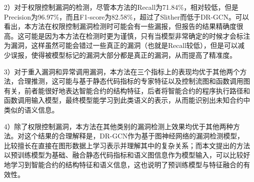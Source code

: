 2）对于权限控制漏洞的检测，尽管本方法的Recall为71.84\%，相对较低，但是Precision为96.97\%，而且F1-score为82.58\%，超过了Slither而低于DR-GCN。可以看出，本方法在权限控制漏洞检测时可能会有一些漏报，但报告的结果精确度很高。这可能是因为本方法在检测时更为谨慎，只有当模型非常确定的时候才会标注为漏洞，这样虽然可能会错过一些真正的漏洞（也就是Recall较低），但是可以减少误报，使得被模型标记的漏洞大部分都是真正的漏洞，从而提高了精准度。

3）对于重入漏洞和异常调用漏洞，本方法在三个指标上的表现均优于其他两个方法，合理推测，这可能与基于静态代码指标的专家特征以及控制流图和函数调用图有关，前者能很好地表达智能合约的结构特征，后者将智能合约的程序执行路径和函数调用输入模型，最终模型能学习到此类语义的表示，从而能识别出未知合约中类似的语义信息。

4）除了权限控制漏洞，本方法在其他类别的漏洞检测上效果均优于其他两种方法。对这个结果的合理解释是，DR-GCN作为基于图神经网络的漏洞检测模型，比较擅长在直接在图形数据上学习表示并理解其中的复杂关系；而本文提出的方法以预训练模型为基础、融合静态代码指标和语义图信息作为模型输入，可以比较好地学习到智能合约的结构特征和语义信息，这也说明了预训练模型与特征融合的有效性。




